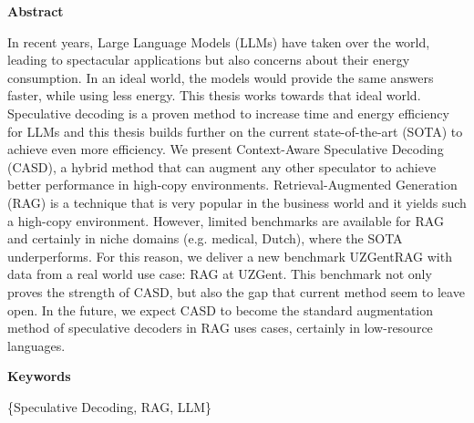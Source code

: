 \maketitle

\vspace{-4em}

\begin{center}
    \textbf{\Large Abstract}
\end{center}

In recent years, Large Language Models (LLMs) have taken over the world, leading to spectacular applications but also concerns about their energy consumption. In an ideal world, the models would provide the same answers faster, while using less energy. This thesis works towards that ideal world. Speculative decoding is a proven method to increase time and energy efficiency for LLMs and this thesis builds further on the current state-of-the-art (SOTA) to achieve even more efficiency. We present Context-Aware Speculative Decoding (CASD), a hybrid method that can augment any other speculator to achieve better performance in high-copy environments. Retrieval-Augmented Generation (RAG) is a technique that is very popular in the business world and it yields such a high-copy environment. However, limited benchmarks are available for RAG and certainly in niche domains (e.g. medical, Dutch), where the SOTA underperforms. For this reason, we deliver a new benchmark UZGentRAG with data from a real world use case: RAG at UZGent. This benchmark not only proves the strength of CASD, but also the gap that current method seem to leave open. In the future, we expect CASD to become the standard augmentation method of speculative decoders in RAG uses cases, certainly in low-resource languages.

\begin{center}
    \textbf{\Large Keywords}
\end{center}
\begin{center}
    \{Speculative Decoding, RAG, LLM\}
\end{center}

